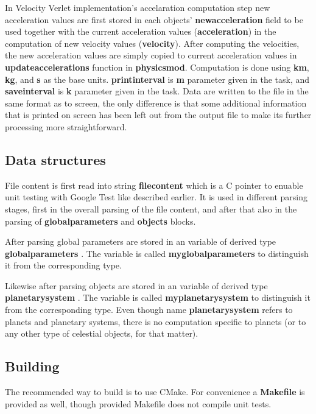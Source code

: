 \documentclass[12pt]{scrartcl}
\begin{document}
In Velocity Verlet implementation's accelaration computation step new acceleration values are first stored in each objects' \textbf{new\textunderscore{}acceleration} field to be used together with the current acceleration values (\textbf{acceleration}) in the computation of new velocity values (\textbf{velocity}). After computing the velocities, the new acceleration values are simply copied to current acceleration values in \textbf{update\textunderscore{}accelerations} function in \textbf{physics\textunderscore{}mod}. Computation is done using \textbf{km}, \textbf{kg}, and \textbf{s} as the base units. \textbf{print\textunderscore{}interval} is \textbf{m} parameter given in the task, and \textbf{save\textunderscore{}interval} is \textbf{k} parameter given in the task. Data are written to the file in the same format as to screen, the only difference is that some additional information that is printed on screen has been left out from the output file to make its further processing more straightforward.

\subsection*{Data structures}
File content is first read into string \textbf{file\textunderscore{}content} which is a C pointer to enuable unit testing with Google Test like described earlier. It is used in different parsing stages, first in the overall parsing of the file content, and after that also in the parsing of \textbf{global\textunderscore{}parameters} and \textbf{objects} blocks.

After parsing global parameters are stored in an variable of derived type \textbf{global\textunderscore{}parameters} . The variable is called \textbf{my\textunderscore{}global\textunderscore{}parameters} to distinguish it from the corresponding type.

Likewise after parsing objects are stored in an variable of derived type \textbf{planetary\textunderscore{}system} . The variable is called \textbf{my\textunderscore{}planetary\textunderscore{}system} to distinguish it from the corresponding type. Even though name \textbf{planetary\textunderscore{}system} refers to planets and planetary systems, there is no computation specific to planets (or to any other type of celestial objects, for that matter).

\subsection*{Building}
The recommended way to build is to use CMake. For convenience a \textbf{Makefile} is provided as well, though provided Makefile does not compile unit tests.
\end{document}
